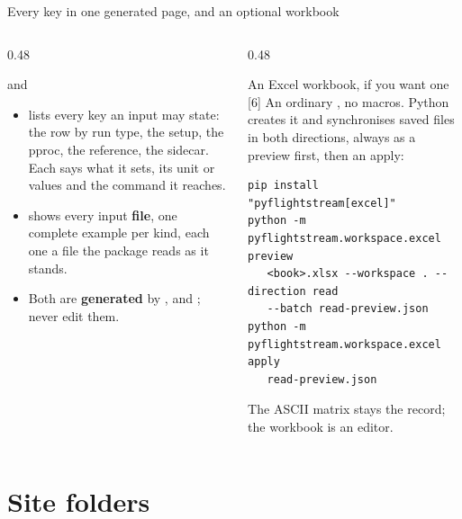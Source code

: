 \begin{frame}[fragile]{Every key in one generated page, and an optional workbook}
\begin{columns}[T]
\begin{column}{0.48\textwidth}
\begin{block}{ and }
\begin{itemize}\small
  \item {} lists every key an input may state: the row by run
        type, the setup, the pproc, the reference, the sidecar. Each says what
        it sets, its unit or values and the command it reaches.
  \item {} shows every input \textbf{file}, one
        complete example per kind, each one a file the package reads as it
        stands.
  \item Both are \textbf{generated} by ,  and
        ; never edit them.
\end{itemize}
\end{block}
\end{column}
\begin{column}{0.48\textwidth}
\begin{block}{An Excel workbook, if you want one [6]}
\small An ordinary , no macros. Python creates it and
synchronises saved files in both directions, always as a preview first, then
an apply:
\begin{lstlisting}[style=ftsbase,basicstyle=\ttfamily\tiny]
pip install "pyflightstream[excel]"
python -m pyflightstream.workspace.excel preview
   <book>.xlsx --workspace . --direction read
   --batch read-preview.json
python -m pyflightstream.workspace.excel apply
   read-preview.json
\end{lstlisting}
The ASCII matrix stays the record; the workbook is an editor.
\end{block}
\end{column}
\end{columns}
\end{frame}

\section{Site folders}

